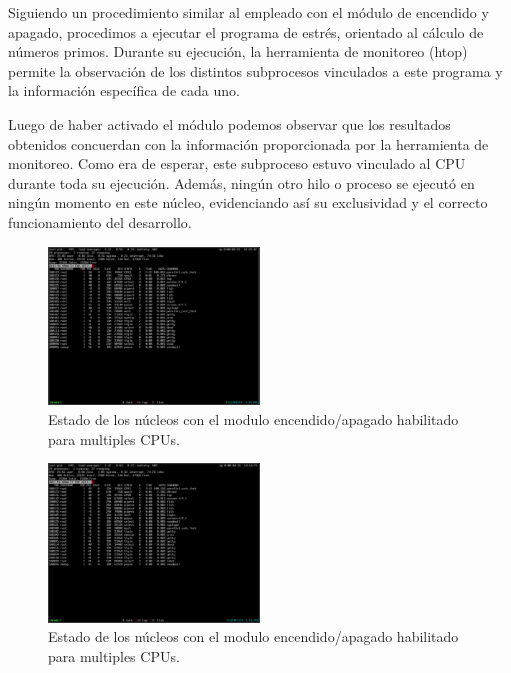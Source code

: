Siguiendo un procedimiento similar al empleado con el módulo de encendido y apagado, procedimos a ejecutar el programa de estrés, orientado al cálculo de números primos. Durante su ejecución, la herramienta de monitoreo (htop) permite la observación de los distintos subprocesos vinculados a este programa y la información específica de cada uno.\par

Luego de haber activado el módulo podemos observar que los resultados obtenidos concuerdan con la información proporcionada por la  herramienta de monitoreo. Como era de esperar, este subproceso estuvo vinculado al CPU durante toda su ejecución. Además, ningún otro hilo o proceso se ejecutó en ningún momento en este núcleo, evidenciando así su exclusividad y el correcto funcionamiento del desarrollo.\par

\begin{figure}[H]
    \centering
    \includegraphics[width=0.5\textwidth]{images/cpuMonopolized-idle.png}
    \caption{Estado de los núcleos con el modulo encendido/apagado habilitado para multiples CPUs.}
    \label{fig:cpuMonopolized-idle}
\end{figure}

\begin{figure}[H]
    \centering
    \includegraphics[width=0.5\textwidth]{images/cpuMonopolized-on.png}
    \caption{Estado de los núcleos con el modulo encendido/apagado habilitado para multiples CPUs.}
    \label{fig:cpuMonopolized-on}
\end{figure}

